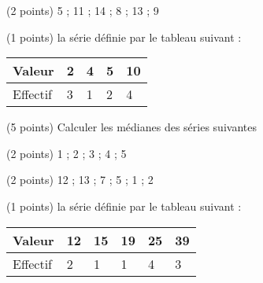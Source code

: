 \cnt (2 points) 5 ; 11 ; 14 ; 8 ; 13 ; 9

\cnt (1 points) la série définie par le tableau suivant :

\begin{tabularx}{\textwidth}{Y*{4}{|Y}}
    Valeur &  2 & 4 & 5 & 10\\ \hline
    Effectif & 3 & 1 & 2 & 4
\end{tabularx} 

\exrc (5 points) Calculer les médianes des séries suivantes

\cnt (2 points) 1 ; 2 ; 3 ; 4 ; 5 

\cnt (2 points) 12 ; 13 ; 7 ; 5 ; 1 ; 2

\cnt (1 points) la série définie par le tableau suivant :

\begin{tabularx}{\textwidth}{Y*{5}{|Y}}
    Valeur &  12 & 15  & 19 & 25 & 39\\ \hline
    Effectif & 2 & 1 & 1 & 4 & 3
\end{tabularx} 